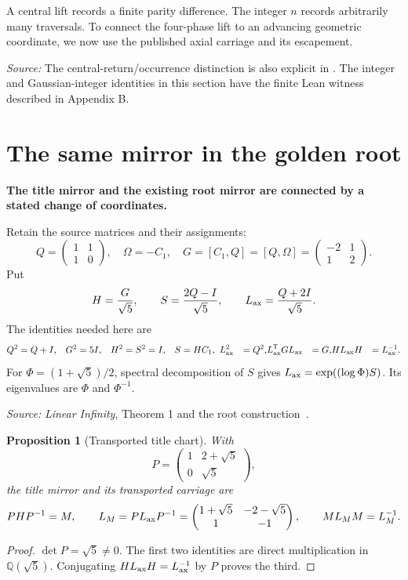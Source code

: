 \documentclass[11pt]{article}
\newtheorem{proposition}[theorem]{Proposition}
\theoremstyle{definition}\newtheorem{definition}[theorem]{Definition}
\newcommand{\src}[1]{\par{\footnotesize\color{muted}\textit{Source:} #1}\par}
\newcommand{\lead}[1]{\textbf{#1}\par}
\newcommand{\page}{\clearpage}
\begin{document}
A central lift records a finite parity difference. The integer $n$ records arbitrarily many traversals. To connect the four-phase lift to an advancing geometric coordinate, we now use the published axial carriage and its escapement.
\src{The central-return/occurrence distinction is also explicit in \cite[\S VI]{METL}. The integer and Gaussian-integer identities in this section have the finite Lean witness described in Appendix B.}

\page
\section{The same mirror in the golden root}
\lead{The title mirror and the existing root mirror are connected by a stated change of coordinates.}
Retain the source matrices and their assignments:
\begin{equation}
 Q=\begin{pmatrix}1&1\\1&0\end{pmatrix},\quad
 \Omega=-C_1,\quad G=[C_1,Q]=[Q,\Omega]=\begin{pmatrix}-2&1\\1&2\end{pmatrix}.
\end{equation}
Put
\begin{equation}
 H=\frac G{\sqrt5},\qquad S=\frac{2Q-I}{\sqrt5},\qquad
 L_{\mathrm{ax}}=\frac{Q+2I}{\sqrt5}.
\end{equation}
The identities needed here are
\begin{align}
 Q^2&=Q+I,&G^2&=5I,&H^2=S^2&=I,& S&=HC_1,\
 L_{\mathrm{ax}}^2&=Q^2,&L_{\mathrm{ax}}^{\mathsf T}GL_{\mathrm{ax}}&=G,&HL_{\mathrm{ax}}H&=L_{\mathrm{ax}}^{-1}.
 \label{eq:root}
\end{align}
For $\Phi=(1+\sqrt5)/2$, spectral decomposition of $S$ gives
$L_{\mathrm{ax}}=\exp((\log\Phi)S)$. Its eigenvalues are $\Phi$ and $\Phi^{-1}$.
\src{\emph{Linear Infinity}, Theorem 1 and the root construction~\cite{LI}.}

\begin{proposition}[Transported title chart]
With
\begin{equation}
 P=\begin{pmatrix}1&2+\sqrt5\\0&\sqrt5\end{pmatrix},
\end{equation}
the title mirror and its transported carriage are
\begin{equation}
 PHP^{-1}=M,\qquad
 L_M=PL_{\mathrm{ax}}P^{-1}=\begin{pmatrix}1+\sqrt5&-2-\sqrt5\\1&-1\end{pmatrix},
 \qquad ML_MM=L_M^{-1}.
 \label{eq:bridge}
\end{equation}
\end{proposition}
\begin{proof}
$\det P=\sqrt5\ne0$. The first two identities are direct multiplication in $\mathbb Q(\sqrt5)$. Conjugating $HL_{\mathrm{ax}}H=L_{\mathrm{ax}}^{-1}$ by $P$ proves the third.
\end{proof}
\end{document}
